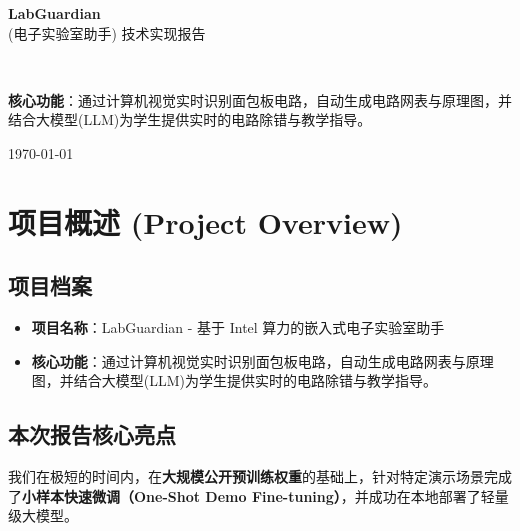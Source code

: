 \documentclass[a4paper,AutoFakeBold,oneside,12pt]{book}
\begin{document}
\begin{titlepage}
    \begin{center}
        \vspace*{3cm}
        {\Huge \bfseries \color{IntelDark} LabGuardian} \\[0.5cm]
        {\Large \color{IntelBlue} (电子实验室助手) 技术实现报告}
        
        \vspace{2cm}
        \noindent\makebox[\linewidth]{\rule{\textwidth}{1.5pt}} \\[0.8cm]
        
        \begin{minipage}{0.8\textwidth}
            \large
            \textbf{核心功能}：通过计算机视觉实时识别面包板电路，自动生成电路网表与原理图，并结合大模型(LLM)为学生提供实时的电路除错与教学指导。
        \end{minipage}
        
        \vfill
        {\large \today}
    \end{center}
\end{titlepage}

\frontmatter
\tableofcontents
\mainmatter


\chapter{项目概述 (Project Overview)}

\section*{项目档案}
\begin{itemize}
    \item \textbf{项目名称}：LabGuardian - 基于 Intel 算力的嵌入式电子实验室助手
    \item \textbf{核心功能}：通过计算机视觉实时识别面包板电路，自动生成电路网表与原理图，并结合大模型(LLM)为学生提供实时的电路除错与教学指导。
\end{itemize}

\section*{本次报告核心亮点}
我们在极短的时间内，在\textbf{大规模公开预训练权重}的基础上，针对特定演示场景完成了\textbf{小样本快速微调（One-Shot Demo Fine-tuning）}，并成功在本地部署了轻量级大模型。
\end{document}
